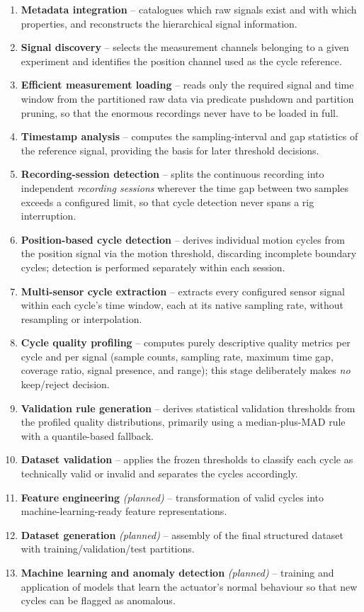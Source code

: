 \begin{enumerate}
  \item \textbf{Metadata integration} -- catalogues which raw signals exist and with which
        properties, and reconstructs the hierarchical signal information.
  \item \textbf{Signal discovery} -- selects the measurement channels belonging to a given
        experiment and identifies the position channel used as the cycle reference.
  \item \textbf{Efficient measurement loading} -- reads only the required signal and time
        window from the partitioned raw data via predicate pushdown and partition pruning,
        so that the enormous recordings never have to be loaded in full.
  \item \textbf{Timestamp analysis} -- computes the sampling-interval and gap statistics of
        the reference signal, providing the basis for later threshold decisions.
  \item \textbf{Recording-session detection} -- splits the continuous recording into
        independent \emph{recording sessions} wherever the time gap between two samples
        exceeds a configured limit, so that cycle detection never spans a rig interruption.
  \item \textbf{Position-based cycle detection} -- derives individual motion cycles from
        the position signal via the motion threshold, discarding incomplete boundary
        cycles; detection is performed separately within each session.
  \item \textbf{Multi-sensor cycle extraction} -- extracts every configured sensor signal
        within each cycle's time window, each at its native sampling rate, without
        resampling or interpolation.
  \item \textbf{Cycle quality profiling} -- computes purely descriptive quality metrics per
        cycle and per signal (sample counts, sampling rate, maximum time gap, coverage
        ratio, signal presence, and range); this stage deliberately makes \emph{no}
        keep/reject decision.
  \item \textbf{Validation rule generation} -- derives statistical validation thresholds
        from the profiled quality distributions, primarily using a median-plus-MAD rule
        with a quantile-based fallback.
  \item \textbf{Dataset validation} -- applies the frozen thresholds to classify each cycle
        as technically valid or invalid and separates the cycles accordingly.
  \item \textbf{Feature engineering} \emph{(planned)} -- transformation of valid cycles into
        machine-learning-ready feature representations.
  \item \textbf{Dataset generation} \emph{(planned)} -- assembly of the final structured
        dataset with training/validation/test partitions.
  \item \textbf{Machine learning and anomaly detection} \emph{(planned)} -- training and
        application of models that learn the actuator's normal behaviour so that new cycles
        can be flagged as anomalous.
\end{enumerate}

